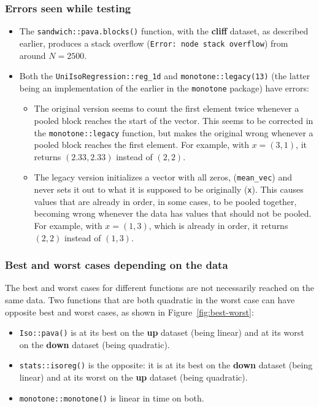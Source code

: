 \documentclass{article}
\begin{document}
\subsubsection{Errors seen while testing}
\label{sec:errors}

\begin{itemize}
    \item The \texttt{sandwich::pava.blocks()} function, with the \textbf{cliff} dataset, as described earlier, produces a stack overflow (\texttt{Error: node stack overflow}) from around $N=2500$.
    \item Both the \texttt{UniIsoRegression::reg\_1d} and \texttt{monotone::legacy(13)} (the latter being an implementation of the earlier in the \texttt{monotone} package) have errors:
    \begin{itemize}
        \item The original version seems to count the first element twice whenever a pooled block reaches the start of the vector. This seems to be corrected in the \texttt{monotone::legacy} function, but makes the original wrong whenever a pooled block reaches the first element. For example, with $x = (3, 1)$, it returns $(2.33, 2.33)$ instead of $(2, 2)$.
        \item The legacy version initializes a vector with all zeros, (\texttt{mean\_vec}) and never sets it out to what it is supposed to be originally (\texttt{x}). This causes values that are already in order, in some cases, to be pooled together, becoming wrong whenever the data has values that should not be pooled. For example, with $x = (1, 3)$, which is already in order, it returns $(2, 2)$ instead of $(1, 3)$.
    \end{itemize}
\end{itemize}

\subsubsection{Best and worst cases depending on the data}

The best and worst cases for different functions are not necessarily reached on the same data. Two functions that are both quadratic in the worst case can have opposite best and worst cases, as shown in Figure~\ref{fig:best-worst}:
\begin{itemize}
    \item \texttt{Iso::pava()} is at its best on the \textbf{up} dataset (being linear) and at its worst on the \textbf{down} dataset (being quadratic).
    \item \texttt{stats::isoreg()} is the opposite: it is at its best on the \textbf{down} dataset (being linear) and at its worst on the \textbf{up} dataset (being quadratic).
    \item \texttt{monotone::monotone()} is linear in time on both.
\end{itemize}
\end{document}
